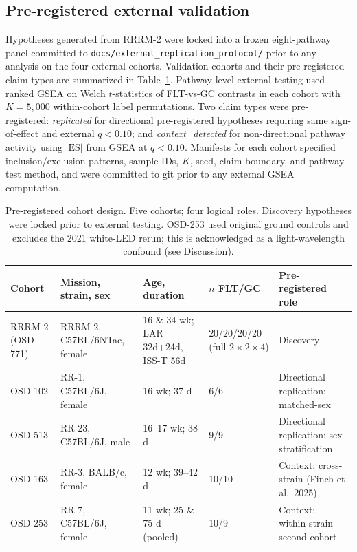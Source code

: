 \documentclass[11pt]{article}
\newcommand{\code}[1]{\texttt{#1}}
\begin{document}
\subsection{Pre-registered external validation}

Hypotheses generated from RRRM-2 were locked into a frozen eight-pathway panel committed to \code{docs/external\_replication\_protocol/} prior to any analysis on the four external cohorts. Validation cohorts and their pre-registered claim types are summarized in Table~\ref{tab:cohorts}. Pathway-level external testing used ranked GSEA \citep{subramanian2005gene} on Welch $t$-statistics of FLT-vs-GC contrasts in each cohort with $K{=}5{,}000$ within-cohort label permutations. Two claim types were pre-registered: \emph{replicated} for directional pre-registered hypotheses requiring same sign-of-effect and external $q < 0.10$; and \emph{context\_detected} for non-directional pathway activity using $|\mathrm{ES}|$ from GSEA at $q < 0.10$. Manifests for each cohort specified inclusion/exclusion patterns, sample IDs, $K$, seed, claim boundary, and pathway test method, and were committed to git prior to any external GSEA computation.

\begin{table}[h]
\centering\small
\begin{tabular}{lp{2.6cm}p{2.2cm}p{1.7cm}p{4cm}}
\toprule
Cohort & Mission, strain, sex & Age, duration & $n$ FLT/GC & Pre-registered role \\
\midrule
RRRM-2 (OSD-771) & RRRM-2, C57BL/6NTac, female & 16 \& 34 wk; LAR 32d{+}24d, ISS-T 56d & 20/20/20/20 (full $2{\times}2{\times}4$) & Discovery \\
OSD-102 & RR-1, C57BL/6J, female & 16 wk; 37 d & 6/6 & Directional replication: matched-sex \\
OSD-513 & RR-23, C57BL/6J, male & 16--17 wk; 38 d & 9/9 & Directional replication: sex-stratification \\
OSD-163 & RR-3, BALB/c, female & 12 wk; 39--42 d & 10/10 & Context: cross-strain (Finch et al.\ 2025) \\
OSD-253 & RR-7, C57BL/6J, female & 11 wk; 25 \& 75 d (pooled) & 10/9 & Context: within-strain second cohort \\
\bottomrule
\end{tabular}
\caption{Pre-registered cohort design. Five cohorts; four logical roles. Discovery hypotheses were locked prior to external testing. OSD-253 used original ground controls and excludes the 2021 white-LED rerun; this is acknowledged as a light-wavelength confound (see Discussion).}
\label{tab:cohorts}
\end{table}
\end{document}
